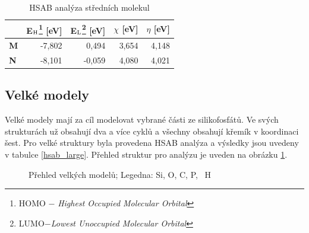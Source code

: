 \documentclass[
  digital, %
  table,   %
  lof,     %
  lot,     %
  oneside,
]{fithesis3}
\begin{document}
\begin{table}[htbp]
\begin{minipage}{\textwidth}
\caption{HSAB analýza středních molekul}
\begin{center}
\begin{tabular}{|l|r|r|r|r|}
\hline
\label{hsab_middle}& E$_{\ce{H}}$\footnote{HOMO $-$ \textit{Highest Occupied Molecular Orbital}} [eV] & E$_{\ce{L}}$\footnote{LUMO$ - $\textit{Lowest Unoccupied Molecular Orbital}} [eV]& $\chi$ [eV] & $\eta$ [eV] \\ \hline
\textbf{M} & -7,802 & 0,494 & 3,654 & 4,148 \\ \hline
\textbf{N} & -8,101 & -0,059 & 4,080 & 4,021 \\ \hline
\end{tabular}
\end{center}
\end{minipage}
\end{table}


\subsection{Velké modely}
Velké modely mají za cíl modelovat vybrané části ze silikofosfátů. Ve svých strukturách už obsahují dva a více cyklů a všechny obsahují křemík v koordinaci šest. Pro velké struktury byla provedena HSAB analýza a výsledky jsou uvedeny v tabulce \ref{hsab_large}. Přehled struktur pro analýzu je uveden na obrázku \ref{prehled_large}.
\begin{figure}
\begin{center}
\caption{Přehled velkých modelů;  Legedna:  Si,  O,  C,  P, ~H}
\label{prehled_large}
\end{center}
\end{figure}
\end{document}
